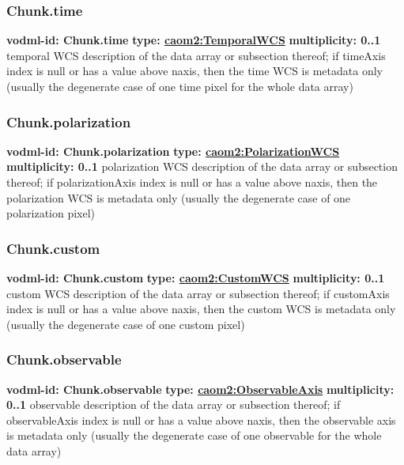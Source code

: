     \subsubsection{Chunk.time}
      \textbf{vodml-id: Chunk.time} \newline
      \textbf{type: \hyperref[sect:TemporalWCS]{caom2:TemporalWCS}} \newline
      \textbf{multiplicity: 0..1} \newline
      temporal WCS description of the data array or subsection thereof; if timeAxis index is null or has a value above {naxis}, then the time WCS is metadata only (usually the degenerate case of one time pixel for the whole data array)

    \subsubsection{Chunk.polarization}
      \textbf{vodml-id: Chunk.polarization} \newline
      \textbf{type: \hyperref[sect:PolarizationWCS]{caom2:PolarizationWCS}} \newline
      \textbf{multiplicity: 0..1} \newline
      polarization WCS description of the data array or subsection thereof; if polarizationAxis index is null or has a value above {naxis}, then the polarization WCS is metadata only (usually the degenerate case of one polarization pixel)

    \subsubsection{Chunk.custom}
      \textbf{vodml-id: Chunk.custom} \newline
      \textbf{type: \hyperref[sect:CustomWCS]{caom2:CustomWCS}} \newline
      \textbf{multiplicity: 0..1} \newline
      custom WCS description of the data array or subsection thereof; if customAxis index is null or has a value above {naxis}, then the custom WCS is metadata only (usually the degenerate case of one custom pixel)

    \subsubsection{Chunk.observable}
      \textbf{vodml-id: Chunk.observable} \newline
      \textbf{type: \hyperref[sect:ObservableAxis]{caom2:ObservableAxis}} \newline
      \textbf{multiplicity: 0..1} \newline
      observable description of the data array or subsection thereof; if observableAxis index is null or has a value above {naxis}, then the observable axis is metadata only (usually the degenerate case of one observable for the whole data array)

